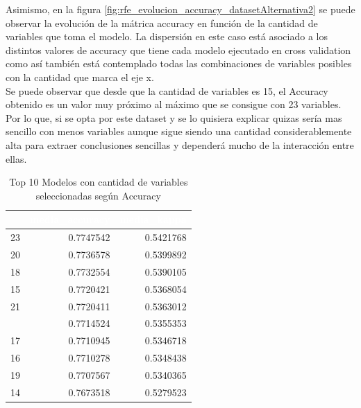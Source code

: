 Asimismo, en la figura \ref{fig:rfe_evolucion_accuracy_datasetAlternativa2} se puede observar la evolución de la mátrica accuracy en función de la cantidad de variables que toma el modelo. La dispersión en este caso está asociado a los distintos valores de accuracy que tiene cada modelo ejecutado en cross validation como así también está contemplado todas las combinaciones de variables posibles con la cantidad que marca el eje x.\\
Se puede observar que desde que la cantidad de variables es 15, el Accuracy obtenido es un valor muy próximo al máximo que se consigue con 23 variables. Por lo que, si se opta por este dataset y se lo quisiera explicar quizas sería mas sencillo con menos variables aunque sigue siendo una cantidad considerablemente alta para extraer conclusiones sencillas y dependerá mucho de la interacción entre ellas.\\


\begin{table}[!h]
	
	\caption{\label{tab:top_10_rfe_accuracy_datasetAlternativa2}Top 10 Modelos con cantidad de variables seleccionadas según Accuracy}
	\centering
	\begin{tabular}[t]{rrr}
		\toprule
		\rowcolor{black}  \multicolumn{1}{c}{\textcolor{white}{\textbf{Variables}}} & \multicolumn{1}{c}{\textcolor{white}{\textbf{media\_accuracy}}} & \multicolumn{1}{c}{\textcolor{white}{\textbf{media\_kappa}}}\\
		\midrule
		\rowcolor{gray!6}  23 & 0.7747542 & 0.5421768\\
		20 & 0.7736578 & 0.5399892\\
		\rowcolor{gray!6}  18 & 0.7732554 & 0.5390105\\
		15 & 0.7720421 & 0.5368054\\
		\rowcolor{gray!6}  21 & 0.7720411 & 0.5363012\\
		\addlinespace
		22 & 0.7714524 & 0.5355353\\
		\rowcolor{gray!6}  17 & 0.7710945 & 0.5346718\\
		16 & 0.7710278 & 0.5348438\\
		\rowcolor{gray!6}  19 & 0.7707567 & 0.5340365\\
		14 & 0.7673518 & 0.5279523\\
		\bottomrule
	\end{tabular}
\end{table}

